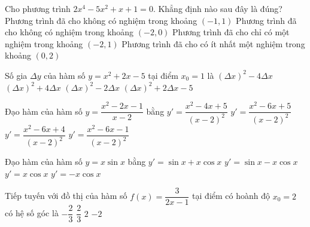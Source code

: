 \begin{ex}%
	Cho phương trình $2x^4 - 5x^2 + x + 1 = 0$. Khẳng định nào sau đây là đúng? 
	\choice
	{Phương trình đã cho không có nghiệm trong khoảng $ (-1,1) $}
	{Phương trình đã cho không có nghiệm trong khoảng $ (-2,0) $}
	{Phương trình đã cho chỉ có một nghiệm trong khoảng $ (-2,1) $}
	{\True Phương trình đã cho có ít nhất một nghiệm trong khoảng $ (0,2) $}
	\end{ex}

\begin{ex}%
	Số gia $\Delta y$ của hàm số $y = x^2 + 2x - 5$ tại điểm $x_0 = 1$ là
	\choice
	{$\left( \Delta x \right)^2 - 4\Delta x$}
	{\True $\left( \Delta x \right)^2 + 4\Delta x$}
	{$\left(\Delta x \right)^2 - 2\Delta x$}
	{$\left( \Delta x \right)^2 + 2\Delta x - 5$}
	\end{ex}
	
\begin{ex}%
	Đạo hàm của hàm số $y = \dfrac{x^2 - 2x - 1}{x - 2}$ bằng 
	\choice
	{\True $y' = \dfrac{x^2 - 4x + 5}{(x - 2)^2}$}
	{$y' = \dfrac{x^2 - 6x + 5}{(x - 2)^2}$}
	{$y' = \dfrac{x^2 - 6x + 4}{(x - 2)^2}$}
	{$y' = \dfrac{x^2 - 6x - 1}{(x - 2)^2}$}
	\end{ex}
	
\begin{ex}%
	Đạo hàm của hàm số $y = x\sin x$ bằng
	\choice
	{\True $y' = \sin x + x\cos x$}
	{$y' = \sin x - x\cos x$}
	{$y' = x\cos x$}
	{$y' =  - x\cos x$}
	\end{ex}
	
\begin{ex}%
	Tiếp tuyến với đồ thị của hàm số $f(x) = \dfrac{3}{2x - 1}$ tại điểm có hoành độ $x_0 = 2$ có hệ số góc là
	\choice
	{\True $ - \dfrac{2}{3}$}
	{$\dfrac{2}{3}$}
	{$ 2 $}
	{$ -2 $}
	\end{ex}
	
